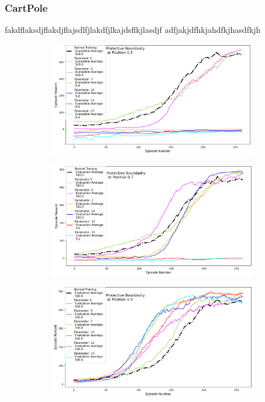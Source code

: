 \documentclass[journal]{IEEEtran}
\begin{document}
\subsubsection{CartPole}
fakdflaksdjflakdjflajsdlfjlakdfjlkajdsflkjlasdjf
adfjakjdfhkjahdfkjhasdfkjh
\begin{figure}[H]
    \centering
    \captionsetup[subfigure]{font=scriptsize,labelfont=scriptsize}
    \begin{subfigure}[b]{0.5\textwidth}
      \centering
      \includegraphics[width=\textwidth]{Cartpole_with_Boundary_at_0.5.png}
    \end{subfigure}
    \vspace*{0.0mm}
    \begin{subfigure}[b]{0.5\textwidth}
      \centering
      \includegraphics[width=\textwidth]{Cartpole_with_Boundary_at_0.7.png}
    \end{subfigure}
    \vspace*{0.0mm}
    \begin{subfigure}[b]{0.5\textwidth}
      \centering
      \includegraphics[width=\textwidth]{Cartpole_with_Boundary_at_0.9.png}

\end{subfigure}
\end{figure}
\end{document}

